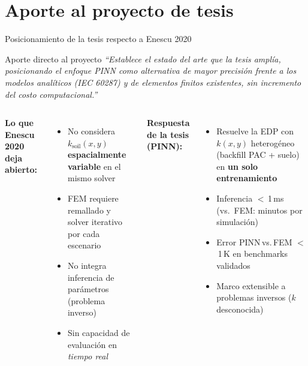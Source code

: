 \documentclass[aspectratio=169]{beamer}
\begin{document}
\section{Aporte al proyecto de tesis}

\begin{frame}{Posicionamiento de la tesis respecto a Enescu 2020}
  \begin{block}{Aporte directo al proyecto}
    \centering
    \textit{``Establece el estado del arte que la tesis amplía,
    posicionando el enfoque PINN como alternativa de mayor precisión
    frente a los modelos analíticos (IEC 60287) y de elementos finitos
    existentes, sin incremento del costo computacional.''}
  \end{block}
  \vspace{0.2em}
  \begin{columns}[T]
      \textbf{Lo que Enescu 2020 deja abierto:}
      \begin{itemize}\small
        \item No considera $k_\text{soil}(x,y)$ \textbf{espacialmente variable}
              en el mismo solver
        \item FEM requiere remallado y solver iterativo por cada escenario
        \item No integra inferencia de parámetros (problema inverso)
        \item Sin capacidad de evaluación en \textit{tiempo real}
      \end{itemize}
      \textbf{Respuesta de la tesis (PINN):}
      \begin{itemize}\small
        \item Resuelve la EDP con $k(x,y)$ heterogéneo (backfill PAC + suelo)
              en \textbf{un solo entrenamiento}
        \item Inferencia $<$\,1\,ms (vs.\ FEM: minutos por simulación)
        \item Error PINN\,vs.\,FEM $<$\,1\,K en benchmarks validados
        \item Marco extensible a problemas inversos ($k$ desconocida)
      \end{itemize}
  \end{columns}
\end{frame}
\end{document}
